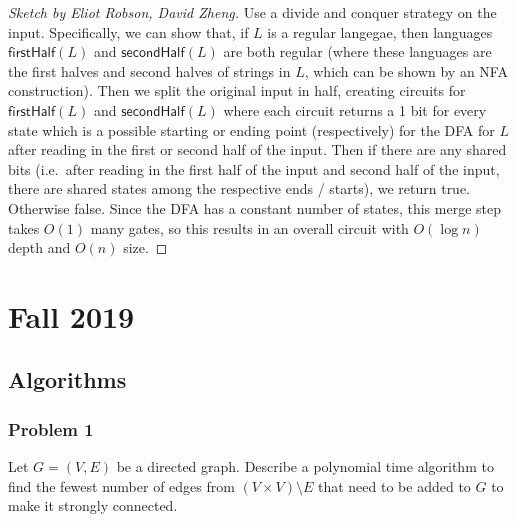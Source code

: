 \documentclass{article}
\newenvironment{sketch}[1]{\begin{proof}[Sketch by #1]}{\end{proof}}
\newcommand{\firstHalf}{\mathsf{firstHalf}}
\newcommand{\secondHalf}{\mathsf{secondHalf}}
\begin{document}
\begin{sketch}{Eliot Robson, David Zheng}
	Use a divide and conquer strategy on the input. Specifically, we can show that, if \(L\) is a regular langegae, then languages \(\firstHalf(L)\) and \(\secondHalf(L)\) are both regular (where these languages are the first halves and second halves of strings in \(L\), which can be shown by an NFA construction). Then we split the original input in half, creating circuits for \(\firstHalf(L)\) and \(\secondHalf(L)\) where each circuit returns a 1 bit for every state which is a possible starting or ending point (respectively) for the DFA for \(L\) after reading in the first or second half of the input. Then if there are any shared bits (i.e.\ after reading in the first half of the input and second half of the input, there are shared states among the respective ends / starts), we return true. Otherwise false. Since the DFA has a constant number of states, this merge step takes \(O(1)\) many gates, so this results in an overall circuit with \(O(\log n)\) depth and \(O(n)\) size.
\end{sketch}

\section{Fall 2019}

\subsection{Algorithms}

\subsubsection{Problem 1}
Let \(G = (V,E)\) be a directed graph. Describe a polynomial time algorithm to find the fewest number of edges from \((V \times V) \setminus E\) that need to be added to \(G\) to make it strongly connected.
\end{document}
